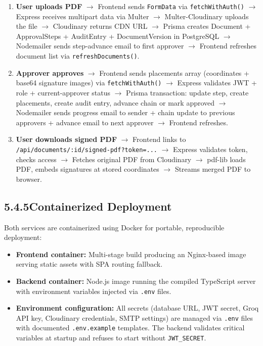 \documentclass[12pt,a4paper]{report}
\newcommand{\citeref}[1]{%
  \textcolor{citeborder}{%
    \fboxsep=2pt%
    \fcolorbox{citeborder}{citebg}{\footnotesize\bfseries[#1]}%
  }%
}
\begin{document}
\begin{enumerate}
    \item \textbf{User uploads PDF} $\rightarrow$ Frontend sends \texttt{FormData} via \texttt{fetchWithAuth()} $\rightarrow$ Express receives multipart data via Multer $\rightarrow$ Multer-Cloudinary uploads the file $\rightarrow$ Cloudinary returns CDN URL $\rightarrow$ Prisma creates Document + ApprovalSteps + AuditEntry + DocumentVersion in PostgreSQL $\rightarrow$ Nodemailer sends step-advance email to first approver $\rightarrow$ Frontend refreshes document list via \texttt{refreshDocuments()}.

    \item \textbf{Approver approves} $\rightarrow$ Frontend sends placements array (coordinates + base64 signature images) via \texttt{fetchWithAuth()} $\rightarrow$ Express validates JWT + role + current-approver status $\rightarrow$ Prisma transaction: update step, create placements, create audit entry, advance chain or mark approved $\rightarrow$ Nodemailer sends progress email to sender + chain update to previous approvers + advance email to next approver $\rightarrow$ Frontend refreshes.

    \item \textbf{User downloads signed PDF} $\rightarrow$ Frontend links to \texttt{/api/documents/:id/signed-pdf?token=...} $\rightarrow$ Express validates token, checks access $\rightarrow$ Fetches original PDF from Cloudinary $\rightarrow$ pdf-lib loads PDF, embeds signatures at stored coordinates $\rightarrow$ Streams merged PDF to browser.
\end{enumerate}

\subsection*{5.4.5\quad Containerized Deployment}

Both services are containerized using Docker \citeref{9} for portable, reproducible deployment:

\begin{itemize}
    \item \textbf{Frontend container:} Multi-stage build producing an Nginx-based image serving static assets with SPA routing fallback.
    \item \textbf{Backend container:} Node.js image running the compiled TypeScript server with environment variables injected via \texttt{.env} files.
    \item \textbf{Environment configuration:} All secrets (database URL, JWT secret, Groq API key, Cloudinary credentials, SMTP settings) are managed via \texttt{.env} files with documented \texttt{.env.example} templates. The backend validates critical variables at startup and refuses to start without \texttt{JWT\_SECRET}.
\end{itemize}
\end{document}
